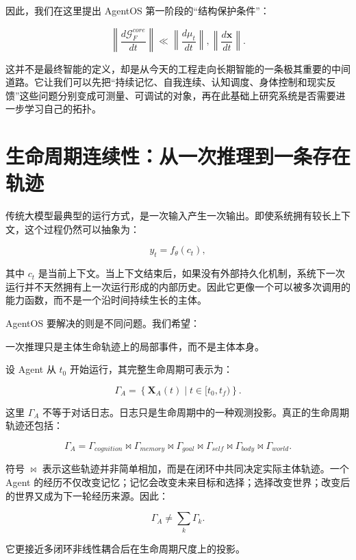 因此，我们在这里提出 AgentOS 第一阶段的“结构保护条件”：

\[
\boxed{
\left\|
\frac{d\mathcal{G}^{core}_F}{dt}
\right\|
\ll
\left\|
\frac{d\mu_t}{dt}
\right\|,
\left\|
\frac{d\mathbf{x}}{dt}
\right\|.
}
\]

这并不是最终智能的定义，却是从今天的工程走向长期智能的一条极其重要的中间道路。它让我们可以先把“持续记忆、自我连续、认知调度、身体控制和现实反馈”这些问题分别变成可测量、可调试的对象，再在此基础上研究系统是否需要进一步学习自己的拓扑。

\section{生命周期连续性：从一次推理到一条存在轨迹}

传统大模型最典型的运行方式，是一次输入产生一次输出。即使系统拥有较长上下文，这个过程仍然可以抽象为：

\[
y_t
=
f_\theta(c_t),
\]

其中 $c_t$ 是当前上下文。当上下文结束后，如果没有外部持久化机制，系统下一次运行并不天然拥有上一次运行形成的内部历史。因此它更像一个可以被多次调用的能力函数，而不是一个沿时间持续生长的主体。

AgentOS 要解决的则是不同问题。我们希望：

\begin{statementbox}
\centering
{}
\end{statementbox}

一次推理只是主体生命轨迹上的局部事件，而不是主体本身。

设 Agent 从 $t_0$ 开始运行，其完整生命周期可表示为：

\[
\Gamma_A
=
\left\{
\mathbf{X}_A(t)
\mid
t\in[t_0,t_f)
\right\}.
\]

这里 $\Gamma_A$ 不等于对话日志。日志只是生命周期中的一种观测投影。真正的生命周期轨迹还包括：

\[
\Gamma_A
=
\Gamma_{cognition}
\bowtie
\Gamma_{memory}
\bowtie
\Gamma_{goal}
\bowtie
\Gamma_{self}
\bowtie
\Gamma_{body}
\bowtie
\Gamma_{world}.
\]

符号 $\bowtie$ 表示这些轨迹并非简单相加，而是在闭环中共同决定实际主体轨迹。一个 Agent 的经历不仅改变记忆；记忆会改变未来目标和选择；选择改变世界；改变后的世界又成为下一轮经历来源。因此：

\[
\Gamma_A
\neq
\sum_k\Gamma_k.
\]

它更接近多闭环非线性耦合后在生命周期尺度上的投影。

